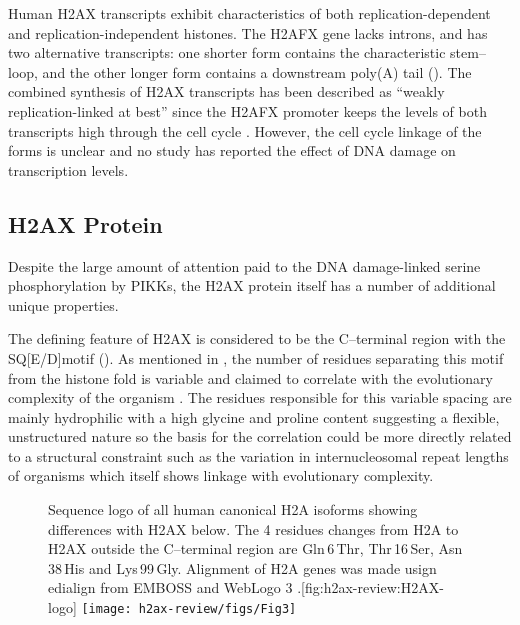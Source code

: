 Human H2AX transcripts exhibit characteristics of both replication-dependent and replication-independent
histones. The H2AFX gene lacks introns, and has two alternative transcripts: one shorter form contains
the characteristic stem--loop, and the other longer form contains a downstream poly(A) tail \citep{CMWMB89}
(). The combined synthesis of H2AX transcripts has been described as ``weakly
replication-linked at best'' since the H2AFX promoter keeps the levels of both transcripts high
through the cell cycle \citep{VSI94}. However, the cell cycle linkage of the forms is unclear and no
study has reported the effect of DNA damage on transcription levels.

\subsection{H2AX Protein}
\label{subsec:h2ax-review:H2AX-protein}
Despite the large amount of attention paid to the DNA damage-linked serine phosphorylation by PIKKs,
the H2AX protein itself has a number of additional unique properties.

The defining feature of H2AX is considered to be the C--terminal region with the SQ[E/D]\textPhi motif
(). As mentioned in , the number of
residues separating this motif from the histone fold is variable and claimed to correlate with the
evolutionary complexity of the organism \citep{CRDP+02}. The residues responsible for this variable
spacing are mainly hydrophilic with a high glycine and proline content suggesting a flexible,
unstructured nature so the basis for the correlation could be more directly related to a structural
constraint such as the variation in internucleosomal repeat lengths of organisms which itself shows
linkage with evolutionary complexity.

\begin{figure}
\begin{sidecaption}{Sequence logo of all human canonical H2A isoforms showing differences with H2AX below. The
4 residues changes from H2A to H2AX outside the C--terminal region are Gln\,6\,Thr, Thr\,16\,Ser, Asn\,38\,His
and Lys\,99\,Gly. Alignment of H2A genes was made usign edialign \protect\citep{Mor99} from EMBOSS
\protect\citep{RLB00} and WebLogo 3 \protect\citep{CHC+04}.}[fig:h2ax-review:H2AX-logo]
\centering
\texttt{[image: h2ax-review/figs/Fig3]}
\end{sidecaption}
\end{figure}

